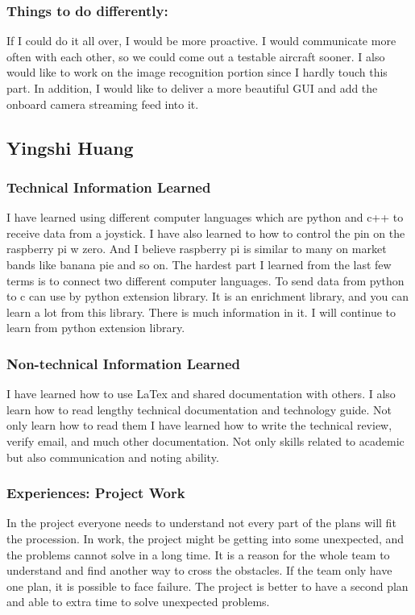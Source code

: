 \documentclass[onecolumn, draftclsnofoot,10pt, compsoc]{IEEEtran}
\begin{document}
\subsubsection{Things to do differently:}
If I could do it all over, I would be more proactive. I would communicate more often with each other, so we could come out a testable aircraft sooner. I also would like to work on the image recognition portion since I hardly touch this part. In addition, I would like to deliver a more beautiful GUI and add the onboard camera streaming feed into it.

\subsection{Yingshi Huang}
\subsubsection{Technical Information Learned}
I have learned using different computer languages which are python and c++ to receive data from a joystick. I have also learned to how to control the pin on the raspberry pi w zero. And I believe raspberry pi is similar to many on market bands like banana pie and so on. The hardest part I learned from the last few terms is to connect two different computer languages. To send data from python to c can use by python extension library. It is an enrichment library, and you can learn a lot from this library. There is much information in it. I will continue to learn from python extension library.

\subsubsection{Non-technical Information Learned}
I have learned how to use LaTex and shared documentation with others. I also learn how to read lengthy technical documentation and technology guide. Not only learn how to read them I have learned how to write the technical review, verify email, and much other documentation. Not only skills related to academic but also communication and noting ability.

\subsubsection{Experiences: Project Work}
In the project everyone needs to understand not every part of the plans will fit the procession. In work, the project might be getting into some unexpected, and the problems cannot solve in a long time. It is a reason for the whole team to understand and find another way to cross the obstacles. If the team only have one plan, it is possible to face failure. The project is better to have a second plan and able to extra time to solve unexpected problems.
\end{document}
